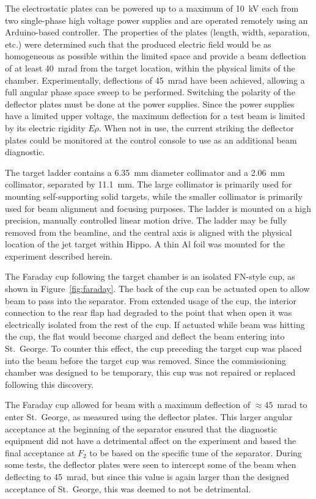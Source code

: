 The electrostatic plates can be powered up to a maximum of 10~kV each
from two single-phase high voltage power supplies and are operated
remotely using an Arduino-based controller. The properties of the plates
(length, width, separation, etc.) were determined such that the produced
electric field would be as homogeneous as possible within the limited
space and provide a beam deflection of at least 40~mrad from the target
location, within the physical limits of the chamber. Experimentally,
deflections of 45~mrad have been achieved, allowing a full angular phase
space sweep to be performed. Switching the polarity of the deflector
plates must be done at the power supplies. Since the power supplies have
a limited upper voltage, the maximum deflection for a test beam is
limited by its electric rigidity $E\rho$. When not in use, the current
striking the deflector plates could be monitored at the control console
to use as an additional beam diagnostic.

The target ladder contains a 6.35~mm diameter collimator and a 2.06~mm
collimator, separated by 11.1~mm. The large collimator is primarily used
for mounting self-supporting solid targets, while the smaller collimator
is primarily used for beam alignment and focusing purposes. The ladder
is mounted on a high precision, manually controlled linear motion drive.
The ladder may be fully removed from the beamline, and the central axis
is aligned with the physical location of the jet target within Hippo. A
thin Al foil was mounted for the experiment described herein.

The Faraday cup following the target chamber is an isolated FN-style
cup, as shown in Figure~\ref{fig:faraday}. The back of the cup can be
actuated open to allow beam to pass into the separator. From extended
usage of the cup, the interior connection to the rear flap had degraded
to the point that when open it was electrically isolated from the rest
of the cup. If actuated while beam was hitting the cup, the flat would
become charged and deflect the beam entering into St.\ George. To
counter this effect, the cup preceding the target cup was placed into
the beam before the target cup was removed. Since the commissioning
chamber was designed to be temporary, this cup was not repaired or
replaced following this discovery.

The Faraday cup allowed for beam with a maximum deflection of $\approx
45$~mrad to enter St.\ George, as measured using the deflector plates.
This larger angular acceptance at the beginning of the separator ensured
that the diagnostic equipment did not have a detrimental affect on the
experiment and based the final acceptance at $F_2$ to be based on the
specific tune of the separator. During some tests, the deflector plates
were seen to intercept some of the beam when deflecting to 45~mrad, but
since this value is again larger than the designed acceptance of St.\
George, this was deemed to not be detrimental.
